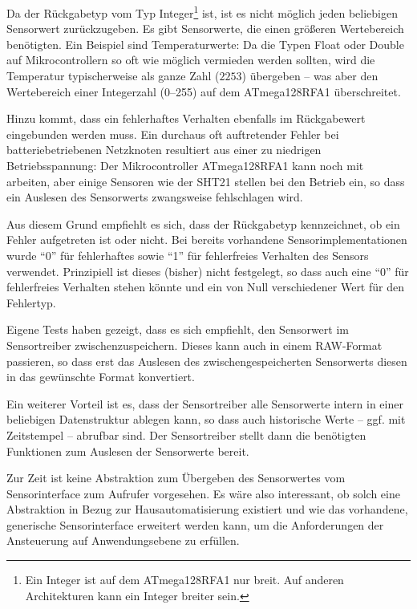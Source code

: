 	Da der Rückgabetyp vom Typ Integer\footnote{Ein Integer ist auf dem
		ATmega128RFA1 nur  breit. Auf anderen Architekturen
		kann ein Integer breiter sein.}
	ist, ist es nicht möglich jeden beliebigen Sensorwert zurückzugeben.
	Es gibt Sensorwerte, die einen größeren Wertebereich benötigten.
	Ein Beispiel sind Temperaturwerte:
	Da die Typen Float oder Double auf Mikrocontrollern so oft wie möglich
	vermieden werden sollten, wird die Temperatur 
	typischerweise als ganze Zahl (\zB \(2253\)) übergeben -- was aber den
	Wertebereich einer Integerzahl (0--255) auf dem ATmega128RFA1
	überschreitet.

	Hinzu kommt, dass ein fehlerhaftes Verhalten
	ebenfalls im Rückgabewert eingebunden werden muss.
	Ein durchaus oft auftretender Fehler bei batteriebetriebenen
	Netzknoten resultiert aus einer zu niedrigen Betriebsspannung:
	Der Mikrocontroller ATmega128RFA1 kann noch mit 
	arbeiten, aber einige Sensoren wie der SHT21 stellen bei 
	den Betrieb ein, so dass ein Auslesen des Sensorwerts zwangsweise
	fehlschlagen wird.

	Aus diesem Grund empfiehlt es sich, dass der Rückgabetyp kennzeichnet,
	ob ein Fehler aufgetreten ist oder nicht. Bei bereits vorhandene
	Sensorimplementationen wurde \enquote{0} für fehlerhaftes
	sowie \enquote{1} für fehlerfreies Verhalten des Sensors verwendet.
	Prinzipiell ist dieses (bisher) nicht festgelegt, so dass auch eine
	\enquote{0} für fehlerfreies Verhalten stehen könnte und ein
	von Null verschiedener Wert für den Fehlertyp.

	Eigene Tests haben gezeigt, dass es sich empfiehlt, den Sensorwert im
	Sensortreiber zwischenzuspeichern.  Dieses kann auch in einem
	RAW-Format passieren, so dass erst das Auslesen des
	zwischengespeicherten Sensorwerts diesen in das gewünschte Format
	konvertiert.

	Ein weiterer Vorteil ist es, dass der Sensortreiber alle
	Sensorwerte intern in einer beliebigen Datenstruktur ablegen kann, so
	dass auch historische Werte -- ggf. mit Zeitstempel -- abrufbar sind.
	Der Sensortreiber stellt dann die benötigten Funktionen zum Auslesen
	der Sensorwerte bereit.

	Zur Zeit ist keine Abstraktion zum Übergeben des Sensorwertes vom
	Sensorinterface zum Aufrufer vorgesehen.
	Es wäre also interessant, ob solch eine Abstraktion in Bezug zur
	Hausautomatisierung existiert und wie das vorhandene, generische
	Sensorinterface erweitert werden kann, um die Anforderungen
	der Ansteuerung auf Anwendungsebene zu erfüllen.
